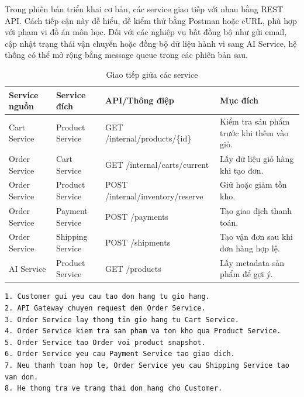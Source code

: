 \documentclass[../main.tex]{subfiles}
\begin{document}
Trong phiên bản triển khai cơ bản, các service giao tiếp với nhau bằng REST API. Cách tiếp cận này dễ hiểu, dễ kiểm thử bằng Postman hoặc cURL, phù hợp với phạm vi đồ án môn học. Đối với các nghiệp vụ bất đồng bộ như gửi email, cập nhật trạng thái vận chuyển hoặc đồng bộ dữ liệu hành vi sang AI Service, hệ thống có thể mở rộng bằng message queue trong các phiên bản sau.

\begin{table}[H]
    \centering
    \caption{Giao tiếp giữa các service}
    \label{tab:chapter4-service-communication}
    \begin{tabular}{|p{}|p{}|p{}|p{}|}
        \hline
        \rowcolor{primary!35}
        \textbf{Service nguồn} & \textbf{Service đích} & \textbf{API/Thông điệp} & \textbf{Mục đích} \\
        \hline
        Cart Service & Product Service & GET /internal/products/\{id\} & Kiểm tra sản phẩm trước khi thêm vào giỏ. \\
        \hline
        Order Service & Cart Service & GET /internal/carts/current & Lấy dữ liệu giỏ hàng khi tạo đơn. \\
        \hline
        Order Service & Product Service & POST /internal/inventory/reserve & Giữ hoặc giảm tồn kho. \\
        \hline
        Order Service & Payment Service & POST /payments & Tạo giao dịch thanh toán. \\
        \hline
        Order Service & Shipping Service & POST /shipments & Tạo vận đơn sau khi đơn hàng hợp lệ. \\
        \hline
        AI Service & Product Service & GET /products & Lấy metadata sản phẩm để gợi ý. \\
        \hline
    \end{tabular}
\end{table}

\begin{lstlisting}[caption={Luồng giao tiếp khi tạo đơn hàng}, label={lst:chapter4-order-communication}]
1. Customer gui yeu cau tao don hang tu gio hang.
2. API Gateway chuyen request den Order Service.
3. Order Service lay thong tin gio hang tu Cart Service.
4. Order Service kiem tra san pham va ton kho qua Product Service.
5. Order Service tao Order voi product snapshot.
6. Order Service yeu cau Payment Service tao giao dich.
7. Neu thanh toan hop le, Order Service yeu cau Shipping Service tao van don.
8. He thong tra ve trang thai don hang cho Customer.
\end{lstlisting}
\end{document}
